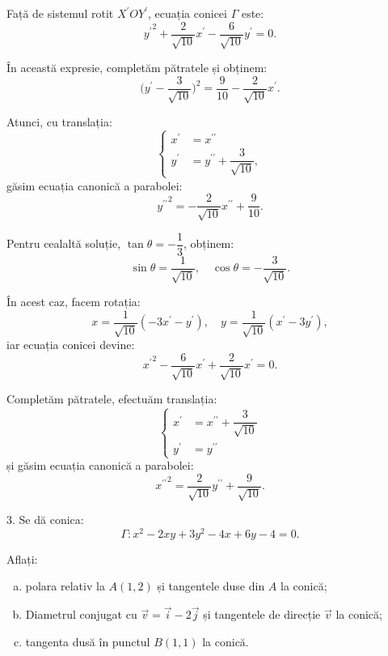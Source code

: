 Față de sistemul rotit $X^{\prime}OY^{\prime}$, ecuația conicei $\Gamma$ este: 
 \[
	{y^{\prime}}^2 + \dfrac{2}{\sqrt{10}}x^{\prime} - 
	\dfrac{6}{\sqrt{10}} y^{\prime} = 0.
\]

În această expresie, completăm pătratele și obținem: 
 \[
    \Big( y^{\prime} - \dfrac{3}{\sqrt{10}} \Big)^2 = 
    \dfrac{9}{10} - \dfrac{2}{\sqrt{10}} x^{\prime}.
\]

Atunci, cu translația: 
 \[
	\begin{cases}	
	    x^{\prime} &= x^{\prime\prime} \\
	    y^{\prime} &= y^{\prime\prime} + \dfrac{3}{\sqrt{10}},
    \end{cases}
\]
găsim ecuația canonică a parabolei: 
 \[
{y^{\prime\prime}}^2 = -\dfrac{2}{\sqrt{10}}x^{\prime\prime} + \dfrac{9}{10}.
\]

Pentru cealaltă soluție, $\tan \theta = -\dfrac{1}{3}$, obținem: 
 \[
\sin\theta = \dfrac{1}{\sqrt{10}}, \quad \cos \theta = - \dfrac{3}{\sqrt{10}}.
\]

În acest caz, facem rotația: 
 \[
	x = \dfrac{1}{\sqrt{10}}(-3x^{\prime} - y^{\prime}), \quad
	y = \dfrac{1}{\sqrt{10}}(x^{\prime} - 3y^{\prime}),
\]
iar ecuația conicei devine: 
 \[
	{x^{\prime}}^2 - \dfrac{6}{\sqrt{10}}x^{\prime} + 
	\dfrac{2}{\sqrt{10}} x^{\prime} = 0.
\]

Completăm pătratele, efectuăm translația: 
 \[
	\begin{cases}	
	    x^{\prime} &= x^{\prime\prime} + \dfrac{3}{\sqrt{10}} \\
	    y^{\prime} &= y^{\prime\prime}
    \end{cases}
\]
și găsim ecuația canonică a parabolei: 
 \[
	{x^{\prime\prime}}^2 = \dfrac{2}{\sqrt{10}}y^{\prime\prime} + 
	\dfrac{9}{\sqrt{10}}.
\]



3. Se dă conica: 
 \[
	\Gamma: x^2 - 2xy + 3y^2 - 4x + 6y - 4 = 0.
\]

Aflați:
\begin{enumerate}[(a)]
	\item polara relativ la $A(1,2)$ și tangentele duse din $A$ la conică;
	\item Diametrul conjugat cu $\vec{v} = \vec{i} - 2 \vec{j}$ și tangentele
de direcție $\vec{v}$ la conică;
	\item tangenta dusă în punctul $B(1,1)$ la conică.
\end{enumerate}

